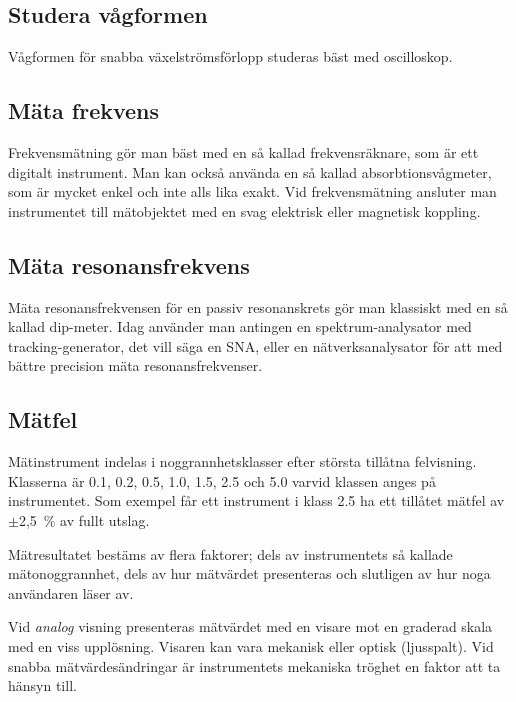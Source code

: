 \subsection{Studera vågformen}

Vågformen för snabba växelströmsförlopp studeras bäst med oscilloskop.

\subsection{Mäta frekvens}

Frekvensmätning gör man bäst med en så kallad frekvensräknare, som är ett
digitalt instrument.
Man kan också använda en så kallad absorbtionsvågmeter, som är mycket enkel och
inte alls lika exakt.
Vid frekvensmätning ansluter man instrumentet till mätobjektet med en
svag elektrisk eller magnetisk koppling.

\newpage %
\subsection{Mäta resonansfrekvens}

Mäta resonansfrekvensen för en passiv resonanskrets gör man klassiskt
med en så kallad dip-meter.
Idag använder man antingen en spektrum-analysator med tracking-generator,
det vill säga en SNA, eller en nätverksanalysator för att med bättre precision
mäta resonansfrekvenser.

\subsection{Mätfel}

Mätinstrument indelas i noggrannhetsklasser efter största tillåtna felvisning.
Klasserna är 0.1, 0.2, 0.5, 1.0, 1.5, 2.5 och 5.0 varvid klassen anges på
instrumentet.
Som exempel får ett instrument i klass 2.5 ha ett tillåtet mätfel av
\(\pm\)2,5~\% av fullt utslag.

Mätresultatet bestäms av flera faktorer; dels av instrumentets
så kallade mätonoggrannhet, dels av hur mätvärdet presenteras och slutligen
av hur noga användaren läser av.

Vid \emph{analog} visning presenteras mätvärdet med en visare mot en
graderad skala med en viss upplösning.
Visaren kan vara mekanisk eller optisk (ljusspalt).
Vid snabba mätvärdesändringar är instrumentets mekaniska tröghet en faktor
att ta hänsyn till.

